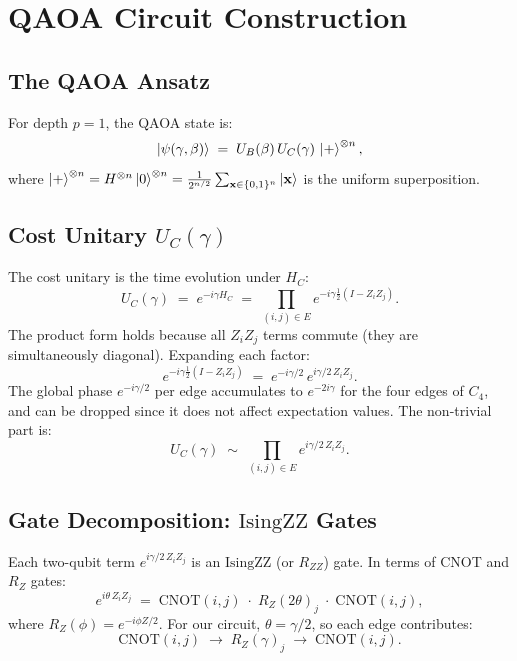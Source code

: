 \documentclass[11pt,a4paper]{article}
\begin{document}
\section{QAOA Circuit Construction}\label{sec:circuit}

\subsection{The QAOA Ansatz}

For depth $p=1$, the QAOA state is:
\begin{equation}\label{eq:qaoa-state}
  \ket{\psi(\gamma,\beta)} \;=\; U_B(\beta)\, U_C(\gamma)\, \ket{+}^{\otimes n},
\end{equation}
where $\ket{+}^{\otimes n} = H^{\otimes n}\ket{0}^{\otimes n} =
\frac{1}{2^{n/2}}\sum_{\mathbf{x}\in\{0,1\}^n}\ket{\mathbf{x}}$ is the
uniform superposition.

\subsection{Cost Unitary $U_C(\gamma)$}

The cost unitary is the time evolution under $H_C$:
\begin{equation}\label{eq:UC}
  U_C(\gamma) \;=\; e^{-i\gamma H_C}
  \;=\; \prod_{(i,j)\in E} e^{-i\gamma \frac{1}{2}(I - Z_i Z_j)}.
\end{equation}
The product form holds because all $Z_iZ_j$ terms commute (they are
simultaneously diagonal).  Expanding each factor:
\begin{equation}
  e^{-i\gamma \frac{1}{2}(I - Z_i Z_j)}
  \;=\; e^{-i\gamma/2}\, e^{i\gamma/2\, Z_i Z_j}.
\end{equation}
The global phase $e^{-i\gamma/2}$ per edge accumulates to $e^{-2i\gamma}$ for
the four edges of $C_4$, and can be dropped since it does not affect
expectation values.  The non-trivial part is:
\begin{equation}\label{eq:UC-gates}
  U_C(\gamma) \;\sim\; \prod_{(i,j)\in E} e^{i\gamma/2\, Z_i Z_j}.
\end{equation}

\subsection{Gate Decomposition: $\mathrm{IsingZZ}$ Gates}

Each two-qubit term $e^{i\gamma/2\, Z_iZ_j}$ is an $\mathrm{IsingZZ}$ (or
$R_{ZZ}$) gate.  In terms of CNOT and $R_Z$ gates:
\begin{equation}
  e^{i\theta\, Z_i Z_j} \;=\;
  \mathrm{CNOT}(i,j)\;\cdot\; R_Z(2\theta)_j \;\cdot\; \mathrm{CNOT}(i,j),
\end{equation}
where $R_Z(\phi) = e^{-i\phi Z/2}$.  For our circuit, $\theta = \gamma/2$, so
each edge contributes:
\begin{equation}
  \mathrm{CNOT}(i,j) \;\to\; R_Z(\gamma)_j \;\to\; \mathrm{CNOT}(i,j).
\end{equation}
\end{document}
